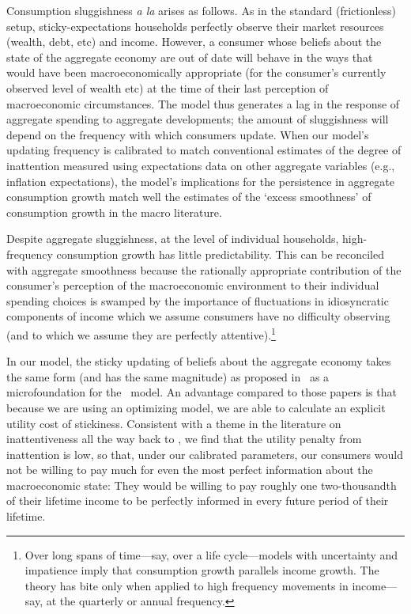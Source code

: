 \documentclass[titlepage]{\econtex}\newcommand{\texname}{cAndCwithStickyE}
\begin{document}
Consumption sluggishness {\it a la} \cite{cdSmooth} arises as follows.  As in the standard (frictionless) setup, sticky-expectations households perfectly observe their market resources (wealth, debt, etc) and income. However, a consumer whose beliefs about the state of the aggregate economy are out of date will behave in the ways that would have been macroeconomically appropriate (for the consumer's currently observed level of wealth etc) at the time of their last perception of macroeconomic circumstances.  The model thus generates a lag in the response of aggregate spending to aggregate developments; the amount of sluggishness will depend on the frequency with which consumers update.  When our model's updating frequency is calibrated to match conventional estimates of the degree of inattention measured using expectations data  on other aggregate variables (e.g., inflation expectations), the model's implications for the persistence in aggregate consumption growth match well the estimates of the `excess smoothness' of consumption growth in the macro literature.

Despite aggregate sluggishness, at the level of individual households, high-frequency consumption growth has little predictability.  This can be reconciled with aggregate smoothness because the rationally appropriate contribution of the consumer's perception of the macroeconomic environment to their individual spending choices is swamped by the importance of fluctuations in idiosyncratic components of income which we assume consumers have no difficulty observing (and to which we assume they are perfectly attentive).\footnote{Over long spans of time---say, over a life cycle---models with uncertainty and impatience imply that consumption growth parallels income growth.  The theory has bite only when applied to high frequency movements in income---say, at the quarterly or annual frequency.}

In our model, the sticky updating of beliefs about the aggregate economy takes the same form (and has the same magnitude) as proposed in~\cite{carroll:epidemicinflQJE} as a microfoundation for the~\cite{mrSlumps} model.  An advantage compared to those papers is that because we are using an optimizing model, we are able to calculate an explicit utility cost of stickiness.  Consistent with a theme in the literature on inattentiveness all the way back to \cite{ayNearRational}, we find that the utility penalty from inattention is low, so that, under our calibrated parameters, our consumers would not be willing to pay much for even the most perfect information about the macroeconomic state:  They would be willing to pay roughly one two-thousandth of their lifetime income to be perfectly informed in every future period of their lifetime.
\end{document}
